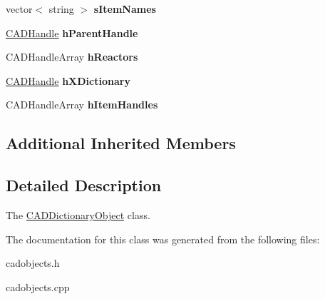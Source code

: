 \begin{DoxyCompactItemize}
\item 
vector$<$ string $>$ {\bfseries s\+Item\+Names}\hypertarget{class_c_a_d_dictionary_object_a2a2897eebfaa60a08887dbe3025b5615}{}\label{class_c_a_d_dictionary_object_a2a2897eebfaa60a08887dbe3025b5615}

\item 
\hyperlink{class_c_a_d_handle}{C\+A\+D\+Handle} {\bfseries h\+Parent\+Handle}\hypertarget{class_c_a_d_dictionary_object_af2a49e3c2ec3fed715474196c6d4c5cb}{}\label{class_c_a_d_dictionary_object_af2a49e3c2ec3fed715474196c6d4c5cb}

\item 
C\+A\+D\+Handle\+Array {\bfseries h\+Reactors}\hypertarget{class_c_a_d_dictionary_object_ace9015530796ea736e243bd362169cc8}{}\label{class_c_a_d_dictionary_object_ace9015530796ea736e243bd362169cc8}

\item 
\hyperlink{class_c_a_d_handle}{C\+A\+D\+Handle} {\bfseries h\+X\+Dictionary}\hypertarget{class_c_a_d_dictionary_object_a559e579e28252978652f9d43846e7a9e}{}\label{class_c_a_d_dictionary_object_a559e579e28252978652f9d43846e7a9e}

\item 
C\+A\+D\+Handle\+Array {\bfseries h\+Item\+Handles}\hypertarget{class_c_a_d_dictionary_object_a5bcb01a52775ba22a75f540a4be952e0}{}\label{class_c_a_d_dictionary_object_a5bcb01a52775ba22a75f540a4be952e0}

\end{DoxyCompactItemize}
\subsection*{Additional Inherited Members}


\subsection{Detailed Description}
The \hyperlink{class_c_a_d_dictionary_object}{C\+A\+D\+Dictionary\+Object} class. 

The documentation for this class was generated from the following files\+:\begin{DoxyCompactItemize}
\item 
cadobjects.\+h\item 
cadobjects.\+cpp\end{DoxyCompactItemize}
